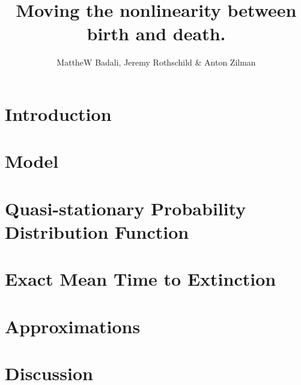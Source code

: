 \documentclass[a4paper,10pt]{article}
\title{Moving the nonlinearity between birth and death.}
\author{MattheW Badali, Jeremy Rothschild \& Anton Zilman}
\numberwithin{equation}{section} %
\begin{document}
\maketitle



\section{Introduction}



\section{Model}



\section{Quasi-stationary Probability Distribution Function}



\section{Exact Mean Time to Extinction}%



\section{Approximations}



\section{Discussion}





\end{document}
